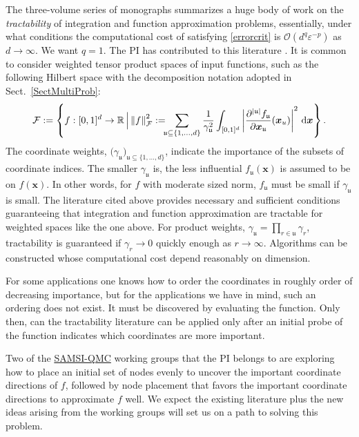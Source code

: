 \documentclass[11pt]{NSFamsart}
\newcommand{\SAMSIQMC}{\hyperlink{SAMSIlink}{SAMSI-QMC}\xspace}
\newcommand{\reals}{{\mathbb{R}}}
\newcommand{\fu}{\mathfrak{u}}
\newcommand{\bx}{{\boldsymbol{x}}}
\def\dif{\textup{d}}
\newcommand{\calf}{{\mathcal{F}}}
\def\abs#1{\ensuremath{\left \lvert #1 \right \rvert}}
\newcommand{\norm}[2][{}]{\ensuremath{\left \lVert #2 \right \rVert}_{#1}}
\newcommand{\Order}{\mathcal{O}}
\begin{document}
The three-volume series of monographs \cite{NovWoz08a,NovWoz10a,NovWoz12a} summarizes a 
huge body of work on the \emph{tractability} of integration and function approximation 
problems, essentially, under what conditions the computational cost of satisfying \eqref{errorcrit} is 
$\Order(d^q \varepsilon^{-p})$ as $d \to \infty$.  We want $q=1$.  The PI has contributed to this 
literature 
\cite{FasHicWoz12b,HicSloWas03a,HicSloWas03b,HicSloWas03c,HicSloWas03e,HicWasWoz06a,HicWoz00b,WanHic00b,YueHic04a,YueHic05a,ZhoHic15a}.
  It is 
common to consider weighted tensor product 
spaces of input functions, such as the following Hilbert space with the decomposition notation 
adopted 
in Sect.\ \ref{SectMultiProb}:
\begin{equation*}
\calf := \left\{ f : [0,1]^d \to \reals \, \Big \vert \norm[\calf]{f}^2 := \!\!\!\sum_{\fu \subseteq \{1, 
\ldots, d\}} 
\frac{1}{\gamma_{\fu}^2}\int_{[0,1]^d}\abs{\frac{\partial^{\abs{\fu}}f_{\fu}}{\partial \bx_\fu}(\bx_u)}^2 
\,  
\dif \bx
\right\}.
\end{equation*}
The coordinate weights, $\bigl(\gamma_{\fu} \bigr)_{\fu \subseteq \{1, \ldots, d\}}$, indicate the 
importance of the subsets of coordinate indices.  The smaller $\gamma_{\fu}$ is, the less influential 
$f_\fu(\bx)$ is assumed to be on $f(\bx)$.  In other words, for $f$ with moderate sized norm, 
$f_\fu$ 
must be small if $\gamma_{\fu}$ is small. The literature cited above provides necessary and 
sufficient conditions 
guaranteeing that integration and function approximation are tractable for weighted spaces like the 
one above.  For product weights, $\gamma_{\fu} = \prod_{r \in \fu} \gamma_r$, tractability is 
guaranteed  
if $\gamma_{r} \to 0$ quickly enough as $r \to \infty$.  Algorithms can be constructed whose 
computational cost depend reasonably on dimension.

For some applications one knows how to order the coordinates in roughly order of decreasing 
importance, but for the applications we have in mind, such an ordering does not exist.  It must be 
discovered by evaluating the function.  Only then, can the 
tractability literature can be applied only after an initial probe of the function indicates 
which coordinates are more important.

Two of the \SAMSIQMC working groups that the PI belongs to are exploring how to
place an initial set 
of nodes evenly to uncover the important coordinate directions of $f$, followed by node 
placement that favors the important 
coordinate directions to approximate $f$ well.  We expect the existing literature plus the new ideas 
arising from the working groups will set us on a path to solving this problem.
\end{document}
